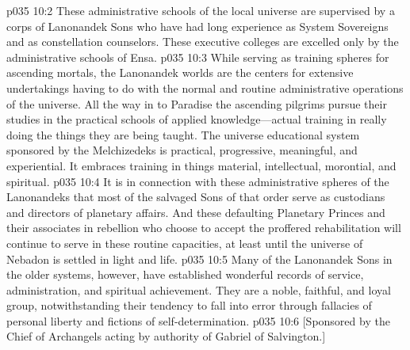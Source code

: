 \vs p035 10:2 These administrative schools of the local universe are supervised by a corps of Lanonandek Sons who have had long experience as System Sovereigns and as constellation counselors. These executive colleges are excelled only by the administrative schools of Ensa.
\vs p035 10:3 While serving as training spheres for ascending mortals, the Lanonandek worlds are the centers for extensive undertakings having to do with the normal and routine administrative operations of the universe. All the way in to Paradise the ascending pilgrims pursue their studies in the practical schools of applied knowledge---actual training in really doing the things they are being taught. The universe educational system sponsored by the Melchizedeks is practical, progressive, meaningful, and experiential. It embraces training in things material, intellectual, morontial, and spiritual.
\pc \vs p035 10:4 It is in connection with these administrative spheres of the Lanonandeks that most of the salvaged Sons of that order serve as custodians and directors of planetary affairs. And these defaulting Planetary Princes and their associates in rebellion who choose to accept the proffered rehabilitation will continue to serve in these routine capacities, at least until the universe of Nebadon is settled in light and life.
\pc \vs p035 10:5 Many of the Lanonandek Sons in the older systems, however, have established wonderful records of service, administration, and spiritual achievement. They are a noble, faithful, and loyal group, notwithstanding their tendency to fall into error through fallacies of personal liberty and fictions of self\hyp{}determination.
\vsetoff
\vs p035 10:6 [Sponsored by the Chief of Archangels acting by authority of Gabriel of Salvington.]
